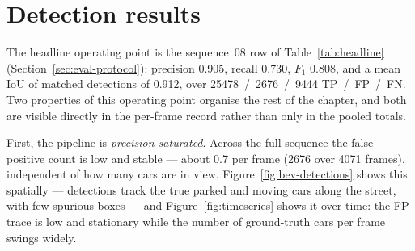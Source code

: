 %
%
%
\section{Detection results}
\label{sec:results-detection}

The headline operating point is the sequence~08 row of Table~\ref{tab:headline}
(Section~\ref{sec:eval-protocol}): precision \num{0.905}, recall \num{0.730}, $F_1$ \num{0.808}, and
a mean IoU of matched detections of \num{0.912}, over
\num{25478}~/~\num{2676}~/~\num{9444} TP~/~FP~/~FN. Two properties of this
operating point organise the rest of the chapter, and both are visible directly
in the per-frame record rather than only in the pooled totals.

First, the pipeline is \emph{precision-saturated}. Across the full sequence the
false-positive count is low and stable --- about \num{0.7} per frame
(\num{2676} over \num{4071} frames), independent of how many cars are in view.
Figure~\ref{fig:bev-detections} shows this spatially --- detections track the
true parked and moving cars along the street, with few spurious boxes --- and
Figure~\ref{fig:timeseries} shows it over time: the FP trace is low and
stationary while the number of ground-truth cars per frame swings widely.

